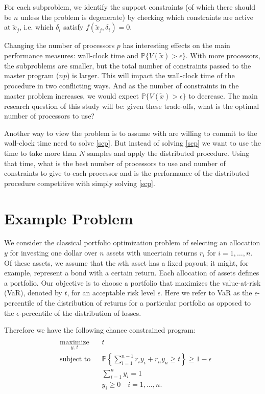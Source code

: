 \documentclass[12pt]{article}
\begin{document}
For each subproblem, we identify the support constraints (of which there should be $n$ unless the problem is degenerate) by checking which constraints are active at $\tilde{x}_j$, i.e. which $\delta_i$ satisfy $f(\tilde{x}_j, \delta_i) = 0$.

Changing the number of processors $p$ has interesting effects on the main performance measures: wall-clock time and $\mathbb{P}\{V(\tilde{x}) > \epsilon\}$.
With more processors, the subproblems are smaller, but the total number of constraints passed to the master program ($np$) is larger.
This will impact the wall-clock time of the procedure in two conflicting ways.
And as the number of constraints in the master problem increases, we would expect $\mathbb{P}\{V(\tilde{x}) > \epsilon\}$ to decrease.
The main research question of this study will be: given these trade-offs, what is the optimal number of processors to use?

Another way to view the problem is to assume with are willing to commit to the wall-clock time need to solve \ref{scp}.
But instead of solving \ref{scp} we want to use the time to take more than $N$ samples and apply the distributed procedure.
Using that time, what is the best number of processors to use and number of constraints to give to each processor and is the performance of the distributed procedure competitive with simply solving \ref{scp}.

\section*{Example Problem}

We consider the classical portfolio optimization problem of selecting an allocation $y$ for investing one dollar over $n$ assets with uncertain returns $r_i$ for $i = 1, \ldots, n$.
Of these assets, we assume that the $n$th asset has a fixed payout; it might, for example, represent a bond with a certain return.
Each allocation of assets defines a portfolio.
Our objective is to choose a portfolio that maximizes the value-at-risk (VaR), denoted by $t$, for an acceptable risk level $\epsilon$.
Here we refer to VaR as the $\epsilon$-percentile of the distribution of returns for a particular portfolio as opposed to the $\epsilon$-percentile of the distribution of losses.

Therefore we have the following chance constrained program:
\begin{align}\label{Portfolioccp}
\begin{split}
\begin{aligned}
    & \underset{y, \,t}{\text{maximize}}
    & & t \\
    & \text{subject to}
    & & \mathbb{P}\left\{ \sum_{i=1}^{n-1} r_i y_i + r_n y_n \geq t \right\} \geq 1-\epsilon \\
    & & & \sum_{i=1}^n y_i = 1 \\
    & & & y_i \geq 0 \quad i = 1, \ldots, n.
\end{aligned}
\end{split} \tag{Portfolio CCP}
\end{align}
\end{document}
